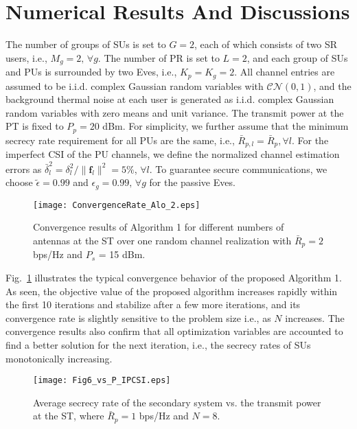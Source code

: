 \documentclass[journal,twoside]{IEEEtran}
\begin{document}
\section{Numerical Results And Discussions}\label{Numerical}
The number of groups of SUs is set to $G=2$,  each of which consists of two SR users, i.e., $M_g=2,\,\forall g$. The number of  PR is set to $L=2$, and each group of SUs and PUs is surrounded by two Eves, i.e., $K_p = K_g = 2$. All  channel entries are assumed to be i.i.d. complex Gaussian random variables with $\mathcal{CN}(0,1)$, and the background thermal noise at each user is generated as i.i.d. complex Gaussian random variables  with zero means and unit variance. The transmit power at the PT is fixed to $P_p=20$ dBm. For simplicity, we further assume that the minimum secrecy rate requirement for all PUs are the same, i.e., $\bar{R}_{p,l}=\bar{R}_{p}, \forall l$.  For the imperfect CSI of the PU channels, we define the normalized channel estimation errors as $\bar{\delta}^2_l=\delta^2_l/\|\mathbf{f}_l\|^2 =5\%$, $\forall l$. To guarantee secure communications, we choose $\tilde{\epsilon}=0.99$ and $\epsilon_g=0.99,\,\forall g$ for the passive Eves.





\begin{figure}
           \texttt{[image: ConvergenceRate\_Alo\_2.eps]}
    			  \caption{Convergence results of Algorithm 1  for different numbers of antennas at the ST over one random channel realization with $\bar{R}_{p} = 2$ bps/Hz and $P_s$ = 15 dBm.}\label{fig:Convergencebehavior:Iteration}
\end{figure}

Fig.~\ref{fig:Convergencebehavior:Iteration} illustrates the typical convergence behavior of the proposed Algorithm 1. As seen, the objective value of the proposed algorithm increases rapidly within the first 10 iterations and stabilize  after a few more iterations, and its convergence rate is slightly sensitive to the problem size i.e., as $N$  increases. The convergence results also confirm that all optimization variables are accounted  to find a better solution for the next iteration, i.e., the secrecy rates of SUs  monotonically increasing. 

\begin{figure}[t]
\centering
\texttt{[image: Fig6\_vs\_P\_IPCSI.eps]}
\caption{ Average secrecy rate of the secondary system  vs. the transmit power at the ST, where $\bar{R}_{p} = 1$ bps/Hz and $N = 8$.}
\label{fig:Fig6:Ps:IPCSI}
\end{figure}
\end{document}
